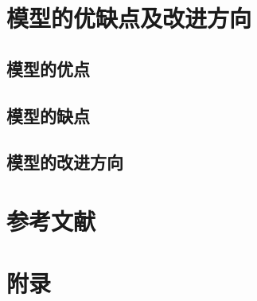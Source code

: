 \documentclass[UTF8]{ctexart}
\begin{document}
\section{模型的优缺点及改进方向}
\subsection{模型的优点}
\subsection{模型的缺点}
\subsection{模型的改进方向}
\section{参考文献}
\section{附录}
\end{document}

